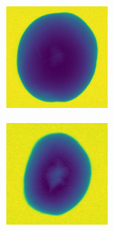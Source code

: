 \documentclass[11pt]{article}
\begin{document}
\begin{figure}[!h]
\begin{subfigure}[b]{0.22\textwidth}
         \caption{}
         \label{fig:hollow_13}
     \end{subfigure}
     \hfill
     \begin{subfigure}[b]{0.22\textwidth}
         \centering
         \includegraphics[width=\textwidth]{figurer/potato_dataset/hollow/hollow_14.jpg}
         \caption{}
         \label{fig:hollow_14}
     \end{subfigure}
     \hfill
     \begin{subfigure}[b]{0.22\textwidth}
         \centering
         \includegraphics[width=\textwidth]{figurer/potato_dataset/hollow/hollow_15.jpg}

\end{subfigure}
\end{figure}
\end{document}
